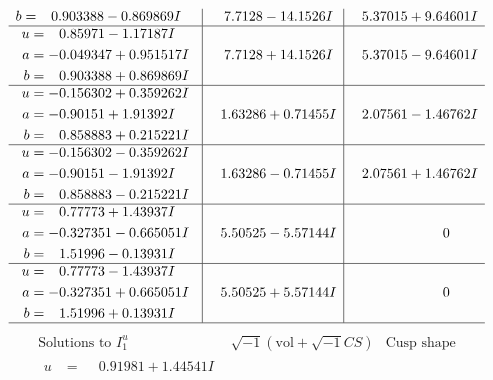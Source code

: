 \documentclass[1p]{elsarticle_modified}
\theoremstyle{definition}
\newcommand{\I}{\sqrt{-1}}
\begin{document}
$$\begin{array}{c|c|c}
\begin{aligned}
b &= \phantom{-}0.903388 - 0.869869 I\end{aligned}
 & \phantom{-}7.7128 - 14.1526 I & \phantom{-}5.37015 + 9.64601 I \\ \hline\begin{aligned}
u &= \phantom{-}0.85971 - 1.17187 I \\
a &= -0.049347 + 0.951517 I \\
b &= \phantom{-}0.903388 + 0.869869 I\end{aligned}
 & \phantom{-}7.7128 + 14.1526 I & \phantom{-}5.37015 - 9.64601 I \\ \hline\begin{aligned}
u &= -0.156302 + 0.359262 I \\
a &= -0.90151 + 1.91392 I \\
b &= \phantom{-}0.858883 + 0.215221 I\end{aligned}
 & \phantom{-}1.63286 + 0.71455 I & \phantom{-}2.07561 - 1.46762 I \\ \hline\begin{aligned}
u &= -0.156302 - 0.359262 I \\
a &= -0.90151 - 1.91392 I \\
b &= \phantom{-}0.858883 - 0.215221 I\end{aligned}
 & \phantom{-}1.63286 - 0.71455 I & \phantom{-}2.07561 + 1.46762 I \\ \hline\begin{aligned}
u &= \phantom{-}0.77773 + 1.43937 I \\
a &= -0.327351 - 0.665051 I \\
b &= \phantom{-}1.51996 - 0.13931 I\end{aligned}
 & \phantom{-}5.50525 - 5.57144 I & \phantom{-0.000000 } 0 \\ \hline\begin{aligned}
u &= \phantom{-}0.77773 - 1.43937 I \\
a &= -0.327351 + 0.665051 I \\
b &= \phantom{-}1.51996 + 0.13931 I\end{aligned}
 & \phantom{-}5.50525 + 5.57144 I & \phantom{-0.000000 } 0\\
 \hline 
 \end{array}$$\newpage$$\begin{array}{c|c|c}  
\text{Solutions to }I^u_{1}& \I (\text{vol} + \sqrt{-1}CS) & \text{Cusp shape}\\
 \hline 
\begin{aligned}
u &= \phantom{-}0.91981 + 1.44541 I \\

\end{aligned}
\end{array}$$
\end{document}
